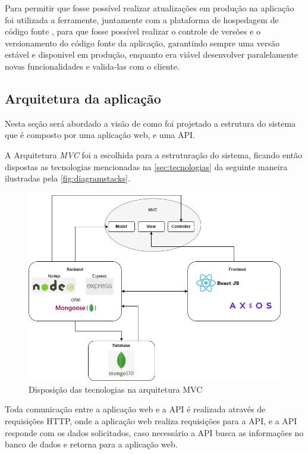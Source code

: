 Para permitir que fosse possível realizar atualizações em produção na aplicação foi utilizada a ferramente\cite{git}, juntamente com a plataforma de hospedagem de código fonte \cite{github}, para que fosse possível realizar o controle de versões e o versionamento do código fonte da aplicação, garantindo sempre uma versão estável e disponivel em produção, enquanto era viável desenvolver paralelamente novas funcionalidades e valida-las com o cliente.

\subsection{Arquitetura da aplicação}
Nesta seção será abordado a visão de como foi projetado a estrutura do sistema que é composto por uma aplicação web, e uma API.

A Arquitetura \textit{MVC} foi a escolhida para a estruturação do sistema, ficando então dispostas as tecnologias mencionadas na \autoref{sec:tecnologias} da seguinte maneira ilustradas pela  \autoref{fig:diagramstacks}.

\begin{figure}[htb]
    \caption{\label{fig:diagramstacks}Disposição das tecnologias na arquitetura MVC}
    \begin{center}
        \includegraphics[scale=0.5]{imagens/diagrama.png}
    \end{center}
\end{figure}


Toda comunicação entre a aplicação web e a API é realizada através de requisições HTTP, onde a aplicação web realiza requisições para a API, e a API responde com os dados solicitados, caso necessário a API busca as informações no banco de dados e retorna para a aplicação web.

